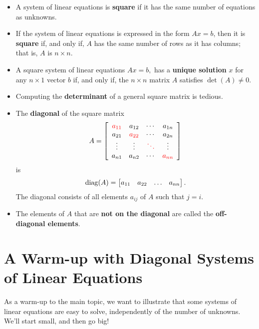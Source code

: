 \begin{itemize}
    \item A system of linear equations is \textbf{square} if it has the same number of equations as unknowns.
    
    \item If the system of linear equations is expressed in the form $Ax=b$, then it is \textbf{square} if, and only if, $A$ has the same number of rows as it has columns; that is, $A$ is $ n \times n$.
    
\item A square system of linear equations 
    $Ax=b,$
    has a \textbf{unique solution} $x$ for any $n\times 1$ vector $b$ if, and only if, the $n \times n$ matrix $A$ satisfies $\det(A) \neq 0.$

    \item Computing the \textbf{determinant} of a general square matrix is tedious.  
    
    \item The \textbf{diagonal} of the square matrix $$A=\left[\begin{array}{cccc} \color{red} a_{11} & a_{12} & \cdots & a_{1n}\\
a_{21} & \color{red} a_{22} & \cdots & a_{2n} \\ \vdots & \vdots & \color{red} \ddots& \vdots \\
a_{n1} & a_{n2} & \cdots & \color{red} a_{nn}\\\end{array}\right]$$
is 
$$ {\rm diag}(A)=\begin{bmatrix}a_{11} & a_{22} & \ldots & a_{nn} \end{bmatrix}. $$
The diagonal consists of all elements $a_{ij}$ of $A$ such that $j=i$.

\item The elements of $A$ that are \textbf{not on the diagonal} are called the \textbf{off-diagonal elements}.

\end{itemize}

\section{A Warm-up with Diagonal Systems of Linear Equations}

As a warm-up to the main topic, we want to illustrate that some systems of linear equations are easy to solve, independently of the number of unknowns. We'll start small, and then go big!\\

